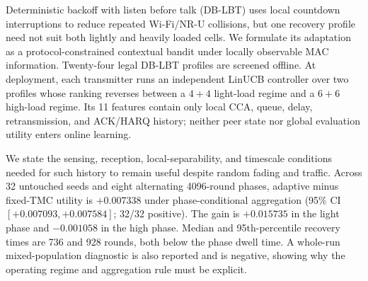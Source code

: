 Deterministic backoff with listen before talk (DB-LBT) uses local countdown
interruptions to reduce repeated Wi-Fi/NR-U collisions, but one recovery
profile need not suit both lightly and heavily loaded cells. We formulate its
adaptation as a protocol-constrained contextual bandit under locally observable
MAC information. Twenty-four legal DB-LBT profiles are screened offline. At
deployment, each transmitter runs an independent LinUCB controller over two
profiles whose ranking reverses between a $4+4$ light-load regime and a $6+6$
high-load regime. Its 11 features contain only local CCA, queue, delay,
retransmission, and ACK/HARQ history; neither peer state nor global evaluation
utility enters online learning.

We state the sensing, reception, local-separability, and timescale conditions
needed for such history to remain useful despite random fading and traffic.
Across 32 untouched seeds and eight alternating 4096-round phases, adaptive
minus fixed-TMC utility is $+0.007338$ under phase-conditional aggregation
(95\% CI $[+0.007093,+0.007584]$; 32/32 positive). The gain is $+0.015735$ in
the light phase and $-0.001058$ in the high phase. Median and 95th-percentile
recovery times are 736 and 928 rounds, both below the phase dwell time. A
whole-run mixed-population diagnostic is also reported and is negative,
showing why the operating regime and aggregation rule must be explicit.
